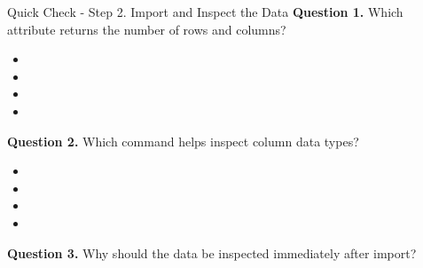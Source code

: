 \documentclass[aspectratio=169,11pt]{beamer}
\begin{document}
\begin{frame}[allowframebreaks]{Quick Check - Step 2. Import and Inspect the Data}
\footnotesize
\textbf{Question 1.} Which attribute returns the number of rows and columns?\par\medskip
\begin{itemize}
\item[\textbf{A.}] \texttt{}
\item[\textbf{B.}] \texttt{}
\item[\textbf{C.}] \texttt{}
\item[\textbf{D.}] \texttt{}
\end{itemize}
\textbf{Question 2.} Which command helps inspect column data types?\par\medskip
\begin{itemize}
\item[\textbf{A.}] \texttt{}
\item[\textbf{B.}] \texttt{}
\item[\textbf{C.}] \texttt{}
\item[\textbf{D.}] \texttt{}
\end{itemize}
\textbf{Question 3.} Why should the data be inspected immediately after import?\par\medskip
\end{frame}
\end{document}
